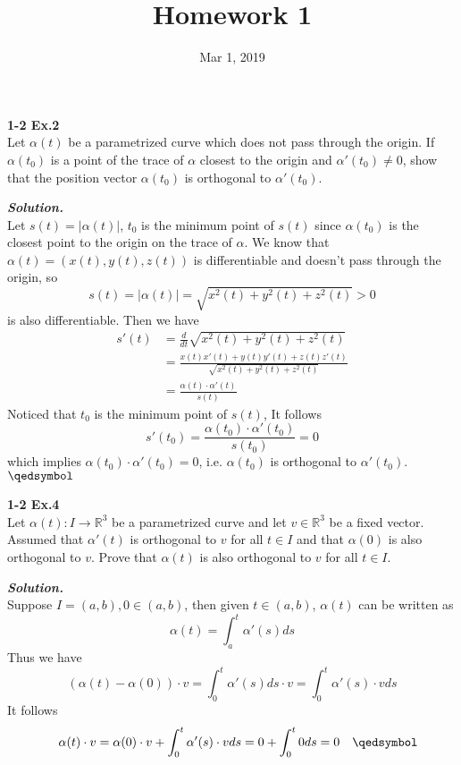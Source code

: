 \documentclass{article}
\begin{document}
\title{Homework 1}
\date{Mar 1, 2019}
\maketitle

\setlength\parindent{0em}   %
\setlength\parskip{1.0\baselineskip} %

\par
\textbf{1-2 Ex.2}\\
Let $\alpha(t)$ be a parametrized curve which does not pass through the origin. If $\alpha(t_0)$
is a point of the trace of $\alpha$ closest to the origin and $\alpha'(t_0) \neq 0$, show that the 
position vector $\alpha(t_0)$ is orthogonal to $\alpha'(t_0)$.

\par
\textbf{\textit{Solution.}}\\
Let $s(t) = |\alpha(t)|$, $t_0$ is the minimum point of $s(t)$ since $\alpha(t_0)$ is the closest 
point to the origin on the trace of $\alpha$.
We know that $\alpha(t) = (x(t), y(t), z(t))$ is differentiable and doesn't pass through the origin, so
$$
s(t) = |\alpha(t)| = \sqrt{x^2(t) + y^2(t) + z^2(t)} > 0
$$ 
is also differentiable. Then we have
$$
\begin{aligned}
s'(t) &= \frac{d}{dt}\sqrt{x^2(t) + y^2(t) + z^2(t)}\\ 
&=\frac{x(t)x'(t) + y(t)y'(t) + z(t)z'(t)}{\sqrt{x^2(t) + y^2(t) + z^2(t)}}\\
&=\frac{\alpha(t) \cdot \alpha'(t)}{s(t)}
\end{aligned}
$$
Noticed that $t_0$ is the minimum point of $s(t)$, It follows
$$
s'(t_0) = \frac{\alpha(t_0) \cdot \alpha'(t_0)}{s(t_0)} = 0
$$
which implies $\alpha(t_0) \cdot \alpha'(t_0) = 0$, i.e. $\alpha(t_0)$ is orthogonal to $\alpha'(t_0)$. \quad $\qedsymbol$

\par
\textbf{1-2 Ex.4}\\
Let $\alpha(t): I \to \mathbb{R}^3$ be a parametrized curve and let $v \in \mathbb{R}^3$ be a fixed
vector. Assumed that $\alpha'(t)$ is orthogonal to $v$ for all $t \in I$ and that $\alpha(0)$ is also
orthogonal to $v$. Prove that $\alpha(t)$ is also orthogonal to $v$ for all $t \in I$.

\par
\textbf{\textit{Solution.}}\\
Suppose $I = (a, b), 0 \in (a, b)$, then given $t \in (a,b)$, $\alpha(t)$ can be written as
$$
    \alpha(t) = \int_a^t\alpha'(s)ds
$$
Thus we have
$$
    (\alpha(t) - \alpha(0)) \cdot v = \int_0^t\alpha'(s)ds \cdot v = \int_0^t\alpha'(s) \cdot v ds
$$
It follows
$$
    \quad \alpha(t) \cdot v = \alpha(0) \cdot v + \int_0^t\alpha'(s) \cdot v ds = 0 + \int_0^t0ds = 0 \quad \qedsymbol
$$
\end{document}
